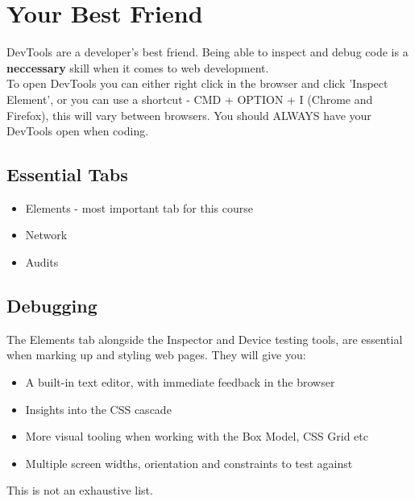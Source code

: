 \section{Your Best Friend}

DevTools are a developer’s best friend. Being able to inspect and debug code is a \textbf{neccessary} skill when it comes to web development.
\\


To open DevTools you can either right click in the browser and click 'Inspect Element', or you can use a shortcut - CMD + OPTION + I (Chrome and Firefox), this will vary between browsers. You should ALWAYS have your DevTools open when coding.
\\

\subsection{Essential Tabs}

\begin{itemize}
    \item Elements - most important tab for this course
    \item Network
    \item Audits
\end{itemize}

\subsection{Debugging}

The Elements tab alongside the Inspector and Device testing tools, are essential when marking up and styling web pages. They will give you:
\\

\begin{itemize}
    \item A built-in text editor, with immediate feedback in the browser
    \item Insights into the CSS cascade
    \item More visual tooling when working with the Box Model, CSS Grid etc
    \item Multiple screen widths, orientation and constraints to test against
\end{itemize}

This is not an exhaustive list.
\\

